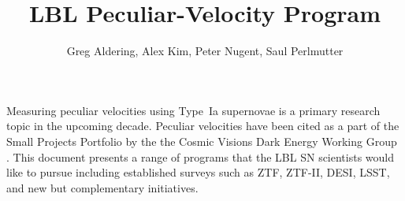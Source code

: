 \documentclass[11pt, oneside]{article}   	%
\title{LBL Peculiar-Velocity Program}
\author{Greg Aldering, Alex Kim, Peter Nugent, Saul Perlmutter}
\begin{document}
\maketitle


Measuring peculiar velocities using Type~Ia supernovae is a primary research topic in the upcoming decade.  Peculiar velocities have
been cited as a part of the   Small Projects Portfolio  by the the Cosmic Visions Dark Energy Working Group \citep{2018arXiv180207216D}.
This document presents a range of programs that the LBL SN scientists would like to pursue including established surveys such as ZTF, ZTF-II,
DESI, LSST, and new but complementary initiatives.







%





\end{document}
